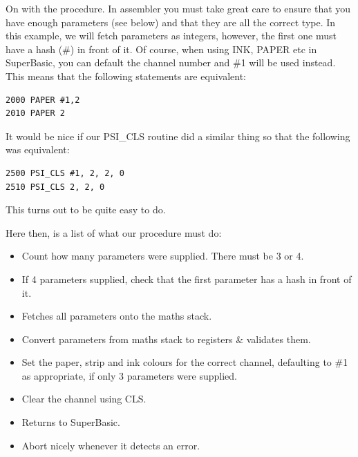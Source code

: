 On with the procedure. In assembler you must take great care to
    ensure that you have enough parameters (see below) and that they are
    all the correct type. In this example, we will fetch parameters as integers, however, the first one must have a hash (\#) in front of it. Of
    course, when using INK, PAPER etc in SuperBasic, you can default the
    channel number and \#1 will be used instead. This means that the following
    statements are equivalent:

\begin{lstlisting}[firstnumber=1,]
2000 PAPER #1,2
2010 PAPER 2
\end{lstlisting}

It would be nice if our PSI\_CLS routine did a similar thing so that
    the following was equivalent:

\begin{lstlisting}[firstnumber=1,]
2500 PSI_CLS #1, 2, 2, 0
2510 PSI_CLS 2, 2, 0
\end{lstlisting}

This turns out to be quite easy to do.

Here then, is a list of what our procedure must do:
\begin{itemize}[itemsep=0pt]

\item{}Count how many parameters were supplied. There must be 3 or
        4.


\item{}If 4 parameters supplied, check that the first parameter has a
        hash in front of it.


\item{}Fetches all parameters onto the maths stack.


\item{}Convert parameters from maths stack to registers \& validates
        them.


\item{}Set the paper, strip and ink colours for the correct channel,
        defaulting to \#1 as appropriate, if only 3 parameters were
        supplied.


\item{}Clear the channel using CLS.


\item{}Returns to SuperBasic.


\item{}Abort nicely whenever it detects an error.

\end{itemize}

